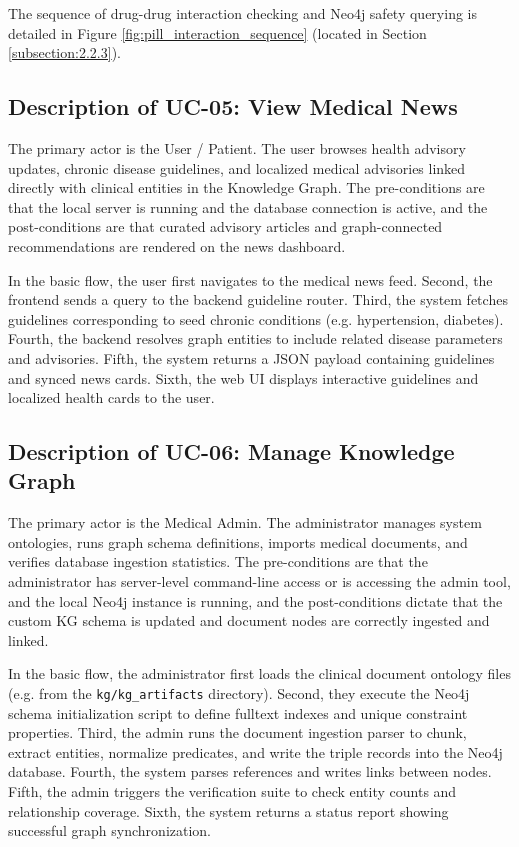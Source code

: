 \documentclass[../main.tex]{subfiles}
\begin{document}
The sequence of drug-drug interaction checking and Neo4j safety querying is detailed in Figure \ref{fig:pill_interaction_sequence} (located in Section \ref{subsection:2.2.3}).

\subsection{Description of UC-05: View Medical News}
The primary actor is the User / Patient. The user browses health advisory updates, chronic disease guidelines, and localized medical advisories linked directly with clinical entities in the Knowledge Graph. The pre-conditions are that the local server is running and the database connection is active, and the post-conditions are that curated advisory articles and graph-connected recommendations are rendered on the news dashboard.

In the basic flow, the user first navigates to the medical news feed. Second, the frontend sends a query to the backend guideline router. Third, the system fetches guidelines corresponding to seed chronic conditions (e.g. hypertension, diabetes). Fourth, the backend resolves graph entities to include related disease parameters and advisories. Fifth, the system returns a JSON payload containing guidelines and synced news cards. Sixth, the web UI displays interactive guidelines and localized health cards to the user.

\subsection{Description of UC-06: Manage Knowledge Graph}
The primary actor is the Medical Admin. The administrator manages system ontologies, runs graph schema definitions, imports medical documents, and verifies database ingestion statistics. The pre-conditions are that the administrator has server-level command-line access or is accessing the admin tool, and the local Neo4j instance is running, and the post-conditions dictate that the custom KG schema is updated and document nodes are correctly ingested and linked.

In the basic flow, the administrator first loads the clinical document ontology files (e.g. from the \texttt{kg/kg\_artifacts} directory). Second, they execute the Neo4j schema initialization script to define fulltext indexes and unique constraint properties. Third, the admin runs the document ingestion parser to chunk, extract entities, normalize predicates, and write the triple records into the Neo4j database. Fourth, the system parses references and writes links between nodes. Fifth, the admin triggers the verification suite to check entity counts and relationship coverage. Sixth, the system returns a status report showing successful graph synchronization.
\end{document}
